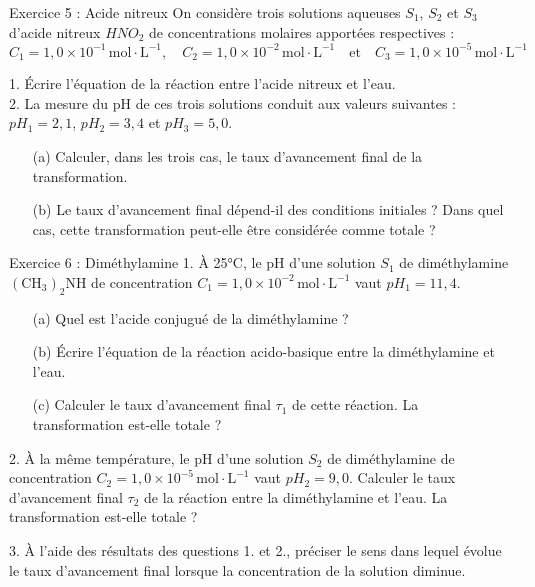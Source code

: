 \documentclass[12pt, french]{article}
\begin{document}
\begin{Box2}{Exercice 5 : Acide nitreux}
On considère trois solutions aqueuses $S_1$, $S_2$ et $S_3$ d’acide nitreux $HNO_2$ de concentrations molaires apportées respectives :
\[
C_1 = 1,0 \times 10^{-1} \, \text{mol} \cdot \text{L}^{-1}, \quad C_2 = 1,0 \times 10^{-2} \, \text{mol} \cdot \text{L}^{-1} \quad \text{et} \quad C_3 = 1,0 \times 10^{-5} \, \text{mol} \cdot \text{L}^{-1}
\]

1. Écrire l’équation de la réaction entre l’acide nitreux et l’eau.\\

2. La mesure du pH de ces trois solutions conduit aux valeurs suivantes : $pH_1 = 2,1$, $pH_2 = 3,4$ et $pH_3 = 5,0$.
   \begin{itemize}
       \item[(a)] Calculer, dans les trois cas, le taux d’avancement final de la transformation.
       \item[(b)] Le taux d’avancement final dépend-il des conditions initiales ? Dans quel cas, cette transformation peut-elle être considérée comme totale ?
   \end{itemize}

\end{Box2}

\begin{Box2}{Exercice 6 : Diméthylamine}  
1. À 25°C, le pH d’une solution $S_1$ de diméthylamine $(\text{CH}_3)_2 \text{NH}$ de concentration $C_1 = 1,0 \times 10^{-2} \, \text{mol} \cdot \text{L}^{-1}$ vaut $pH_1 = 11,4$.\\  
  \begin{itemize}  
    \item[(a)] Quel est l’acide conjugué de la diméthylamine ?  
    \item[(b)] Écrire l’équation de la réaction acido-basique entre la diméthylamine et l’eau.  
    \item[(c)] Calculer le taux d’avancement final $\tau_1$ de cette réaction. La transformation est-elle totale ?  
  \end{itemize}  

2. À la même température, le pH d’une solution $S_2$ de diméthylamine de concentration $C_2 = 1,0 \times 10^{-5} \, \text{mol} \cdot \text{L}^{-1}$ vaut $pH_2 = 9,0$. Calculer le taux d’avancement final $\tau_2$ de la réaction entre la diméthylamine et l’eau. La transformation est-elle totale ?  

3. À l’aide des résultats des questions 1. et 2., préciser le sens dans lequel évolue le taux d’avancement final lorsque la concentration de la solution diminue.  
\end{Box2}
\end{document}
